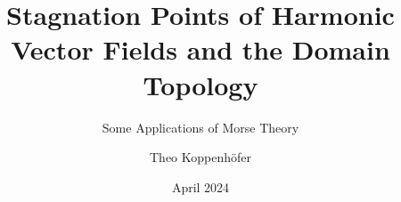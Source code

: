 








\title{Stagnation Points of Harmonic Vector Fields and the Domain Topology}
\subtitle{Some Applications of Morse Theory}
\author{Theo Koppenhöfer}
\date{April 2024}


\graphicspath{{../Art/}}
\graphicspath{{../Plots/}}
\graphicspath{{../Figures/}}





\newcommand{\blankPage}{\newpage\null\thispagestyle{empty}\newpage}
\newcommand{\openX}{\interior\brk*{X}}







\setcounter{page}{-3}
\thispagestyle{empty}

\maketitle

